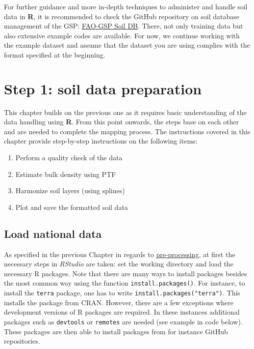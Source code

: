 \documentclass[
  10pt,
  b5paper,
  oneside]{book}
\providecommand{\tightlist}{%
  \setlength{\itemsep}{0pt}\setlength{\parskip}{0pt}}
\begin{document}
For further guidance and more in-depth techniques to administer and handle soil data in \textbf{R}, it is recommended to check the GitHub repository on soil database management of the GSP: \href{https://github.com/FAO-GSP/SoilDB}{FAO-GSP Soil DB}. There, not only training data but also extensive example codes are available.
For now, we continue working with the example dataset and assume that the dataset you are using complies with the format specified at the beginning.

\hypertarget{step-1-soil-data-preparation}{%
\chapter{Step 1: soil data preparation}\label{step-1-soil-data-preparation}}

This chapter builds on the previous one as it requires basic understanding of the data handling using \textbf{R}. From this point onwards, the steps base on each other and are needed to complete the mapping process. The instructions covered in this chapter provide step-by-step instructions on the following items:

\begin{enumerate}
\def\labelenumi{\arabic{enumi}.}
\tightlist
\item
  Perform a quality check of the data
\item
  Estimate bulk density using PTF
\item
  Harmonize soil layers (using splines)
\item
  Plot and save the formatted soil data
\end{enumerate}

\hypertarget{load-national-data}{%
\section{Load national data}\label{load-national-data}}

As specified in the previous Chapter in regards to \href{preproc}{pre-processing}, at first the necessary steps in \emph{RStudio} are taken: set the working directory and load the necessary R packages. Note that there are many ways to install packages besides the most common way using the function \texttt{install.packages()}. For instance, to install the \texttt{terra} package, one has to write \texttt{install.packages("terra")}. This installs the package from CRAN. However, there are a few exceptions where development versions of R packages are required. In these instances additional packages such as \texttt{devtools} or \texttt{remotes} are needed (see example in code below). These packages are then able to install packages from for instance GitHub repositories.
\end{document}
